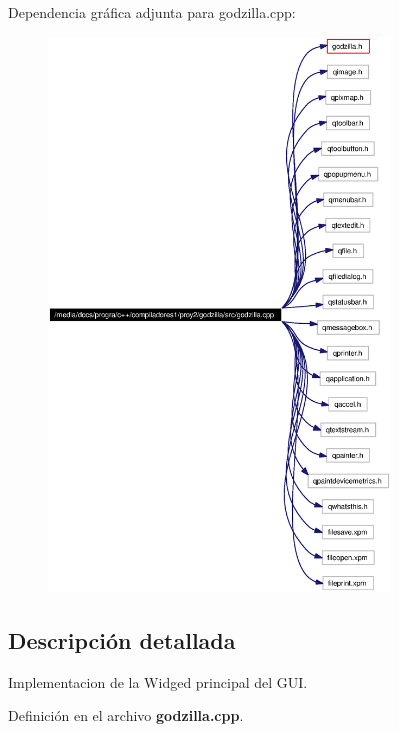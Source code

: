 Dependencia gr\'{a}fica adjunta para godzilla.cpp:\begin{figure}[H]
\begin{center}
\leavevmode
\includegraphics[width=257pt]{godzilla_8cpp__incl}
\end{center}
\end{figure}


\subsection{Descripci\'{o}n detallada}
Implementacion de la Widged principal del GUI. 



Definici\'{o}n en el archivo {\bf godzilla.cpp}.